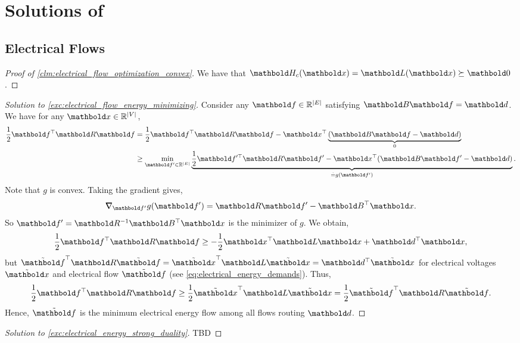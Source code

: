 
\chapter{Solutions of }

\section{Electrical Flows}

\begin{proof}[Proof of \cref{clm:electrical_flow_optimization_convex}] We have that $\mH_c(\vx) = \mL(\vx) \succeq \mZero$.
\end{proof}

\begin{proof}[Solution to \cref{exc:electrical_flow_energy_minimizing}] Consider any $\vf \in \R^{|\sE|}$ satisfying $\mB\vf = \vd$. We have for any $\vx \in \R^{|\sV|}$, \begin{align*}
    \frac{1}{2}\trans{\vf}\mR\vf &= \frac{1}{2}\trans{\vf}\mR\vf - \trans{\vx}\underbrace{(\mB\vf - \vd)}_{0} \\
    &\geq \min_{\vf' \in \R^{|\sE|}} \underbrace{\frac{1}{2}\trans{\vf'}\mR\vf' - \trans{\vx}(\mB\vf' - \vd)}_{\eqdef g(\vf')}.
\end{align*} Note that $g$ is convex. Taking the gradient gives, \begin{align*}
    \grad_{\vf'} g(\vf') = \mR\vf' - \trans{\mB}\vx.
\end{align*} So $\vf' = \inv{\mR}\trans{\mB}\vx$ is the minimizer of $g$. We obtain, \begin{align*}
    \frac{1}{2}\trans{\vf}\mR\vf \geq -\frac{1}{2}\trans{\vx}\mL\vx + \trans{\vd}\vx,
\end{align*} but $\trans{\Tilde{\vf}}\mR\Tilde{\vf} = \trans{\Tilde{\vx}}\mL\Tilde{\vx} = \trans{\vd}\Tilde{\vx}$ for electrical voltages $\Tilde{\vx}$ and electrical flow $\Tilde{\vf}$ (see \cref{eq:electrical_energy_demands}). Thus, \begin{align*}
    \frac{1}{2}\trans{\vf}\mR\vf \geq \frac{1}{2}\trans{\Tilde{\vx}}\mL\Tilde{\vx} = \frac{1}{2}\trans{\Tilde{\vf}}\mR\Tilde{\vf}.
\end{align*} Hence, $\Tilde{\vf}$ is the minimum electrical energy flow among all flows routing $\vd$.
\end{proof}

\begin{proof}[Solution to \cref{exc:electrical_energy_strong_duality}] TBD
\end{proof}


